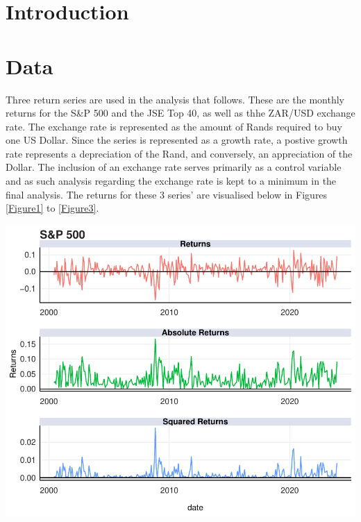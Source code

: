 \documentclass[11pt,preprint, authoryear]{elsarticle}
\let\origfigure\figure
\let\endorigfigure\endfigure
\renewenvironment{figure}[1][2] {
    \expandafter\origfigure\expandafter[H]
} {
    \endorigfigure
}
\numberwithin{equation}{section}
\numberwithin{figure}{section}
\numberwithin{table}{section}
\begin{document}
\headsep 35pt %




\hypertarget{introduction}{%
\section{\texorpdfstring{Introduction
\label{Introduction}}{Introduction }}\label{introduction}}

\hypertarget{data}{%
\section{Data}\label{data}}

Three return series are used in the analysis that follows. These are the
monthly returns for the S\&P 500 and the JSE Top 40, as well as thhe
ZAR/USD exchange rate. The exchange rate is represented as the amount of
Rands required to buy one US Dollar. Since the series is represented as
a growth rate, a postive growth rate represents a depreciation of the
Rand, and conversely, an appreciation of the Dollar. The inclusion of an
exchange rate serves primarily as a control variable and as such
analysis regarding the exchange rate is kept to a minimum in the final
analysis. The returns for these 3 series' are visualised below in
Figures \ref{Figure1} to \ref{Figure3}.

\begin{figure}[H]

{\centering \includegraphics{Template_files/figure-latex/Figure1-1} 

}

\caption{S\&P 500 Returns \label{Figure1}}\label{fig:Figure1}
\end{figure}
\end{document}
